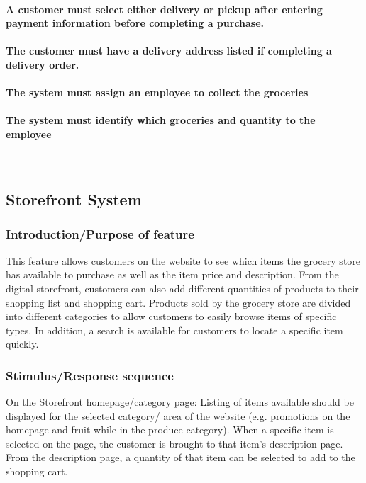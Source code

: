 \documentclass{scrreprt}
\begin{document}
\paragraph[]{\normalfont A customer must select either delivery or pickup after entering payment information before completing a purchase.}

\paragraph[]{\normalfont The customer must have a delivery address listed if completing a delivery order.}
\paragraph[]{\normalfont The system must assign an employee to collect the groceries}
\paragraph[]{\normalfont The system must identify which groceries and quantity to the employee}
~\\


\subsection{Storefront System}
\subsubsection{Introduction/Purpose of feature}
This feature allows customers on the website to see which items the grocery store has available to purchase as well as the item price and description.  From the digital storefront, customers can also add different quantities of products to their shopping list and shopping cart.  Products sold by the grocery store are divided into different categories to allow customers to easily browse items of specific types.  In addition, a search is available for customers to locate a specific item quickly.
\subsubsection{Stimulus/Response sequence}
On the Storefront homepage/category page: Listing of items available should be displayed for the selected category/ area of the website (e.g. promotions on the homepage and fruit while in the produce category).  When a specific item is selected on the page, the customer is brought to that item’s description page.  From the description page, a quantity of that item can be selected to add to the shopping cart.  
\end{document}
